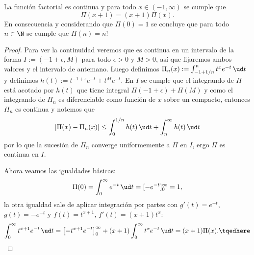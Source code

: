 \begin{thm}
	La función factorial es continua y para todo $x \in (-1, \infty)$ se cumple que
	$$ \Pi(x+1) = (x+1)\Pi(x). $$
	En consecuencia y considerando que $\Pi(0) = 1$ se concluye que para todo $n\in\N$ se cumple que $\Pi(n) = n!$
\end{thm}
\begin{proof}
	Para ver la continuidad veremos que es continua en un intervalo de la forma $I := (-1 + \epsilon, M)$ para todo $\epsilon > 0$ y $M > 0$, así que
	fijaremos ambos valores y el intervalo de antemano.
	Luego definimos $\Pi_n(x) := \int_{-1+1/n}^n t^xe^{-t}\,\ud t$ y definimos $h(t) := t^{-1+\epsilon}e^{-t} + t^Me^{-t}$.
	En $I$ se cumple que el integrando de $\Pi$ está acotado por $h(t)$ que tiene integral $\Pi(-1+\epsilon) + \Pi(M)$ y como el integrando de $\Pi_n$
	es diferenciable como función de $x$ sobre un compacto, entonces $\Pi_n$ es continua y notemos que
	$$ |\Pi(x) - \Pi_n(x)| \le \int_0^{1/n} h(t)\,\ud t + \int_n^\infty h(t) \,\ud t $$
	por lo que la sucesión de $\Pi_n$ converge uniformemente a $\Pi$ en $I$, ergo $\Pi$ es continua en $I$.
	\par
	Ahora veamos las igualdades básicas:
	$$ \Pi(0) = \int_0^\infty e^{-t} \, \ud t = [ -e^{-t} ]_0^\infty = 1, $$
	la otra igualdad sale de aplicar integración por partes con $g'(t) = e^{-t}$, $g(t) = -e^{-t}$ y $f(t) = t^{x+1}$, $f'(t) = (x+1)t^x$:
	\begin{equation}
		\int_0^\infty t^{x+1}e^{-t}\,\ud t = \left[ -t^{x+1}e^{-t} \right]_0^\infty + (x+1)\int_0^\infty t^xe^{-t} \,\ud t = (x+1)\Pi(x). \tqedhere
	\end{equation}
\end{proof}


